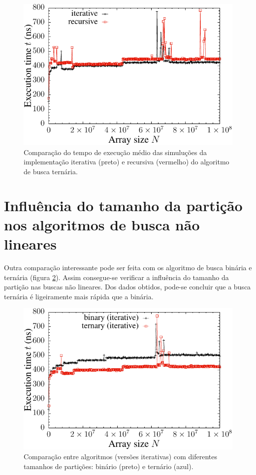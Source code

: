 \begin{figure}[H]
  \centering
  \includegraphics[scale=1.2]{../plots/tsearch_itvsrec_time.pdf}
  \caption{Comparação do tempo de execução médio das simuluções da implementação iterativa (preto) e recursiva (vermelho) do algoritmo de busca ternária.}
  \label{fig:tsearch_ivsr_time}
\end{figure} 


\section{Influência do tamanho da partição nos algoritmos de busca não lineares}

Outra comparação interessante pode ser feita com os algoritmo de busca binária e ternária (figura \ref{fig:bvstvsfib_search_time}). Assim consegue-se verificar a influência do tamanho da partição nas buscas não lineares. Dos dados obtidos, pode-se concluir que a busca ternária é ligeiramente mais rápida que a binária.

\begin{figure}[H]
  \centering
  \includegraphics[scale=1.2]{../plots/bvstvsfib_search_time.pdf}
  \caption{Comparação entre algoritmos (versões iterativas) com diferentes tamanhos de partições: binário (preto) e ternário (azul).}
  \label{fig:bvstvsfib_search_time}
\end{figure} 


